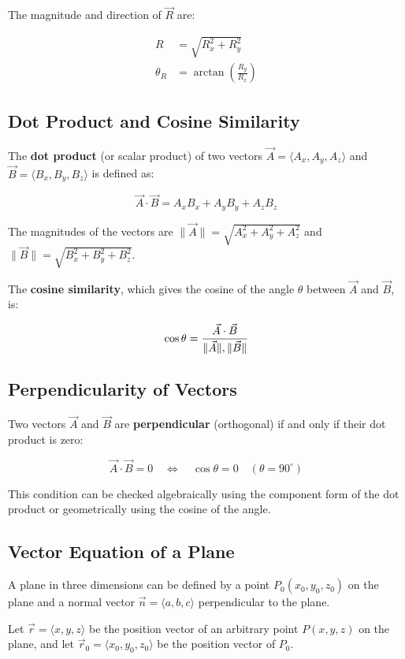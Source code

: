 \documentclass{article}
\begin{document}
\begin{multicols}{2}
The magnitude and direction of $ \vec{R} $ are:

\[
\begin{aligned}
R &= \sqrt{R_x^2 + R_y^2} \\
\theta_R &= \arctan\left( \frac{R_y}{R_x} \right)
\end{aligned}
\]

\subsection*{Dot Product and Cosine Similarity}

The \textbf{dot product} (or scalar product) of two vectors $\vec{A} = \langle A_x, A_y, A_z \rangle$ and $\vec{B} = \langle B_x, B_y, B_z \rangle$ is defined as:

\[
\vec{A} \cdot \vec{B} = A_x B_x + A_y B_y + A_z B_z
\]

The magnitudes of the vectors are $\|\vec{A}\| = \sqrt{A_x^2 + A_y^2 + A_z^2}$ and $\|\vec{B}\| = \sqrt{B_x^2 + B_y^2 + B_z^2}$.  

The \textbf{cosine similarity}, which gives the cosine of the angle $\theta$ between $\vec{A}$ and $\vec{B}$, is:

\[
\cos \theta = \frac{\vec{A} \cdot \vec{B}}{\|\vec{A}\| \\, \|\vec{B}\|}
\]

\subsection*{Perpendicularity of Vectors}

Two vectors $\vec{A}$ and $\vec{B}$ are \textbf{perpendicular} (orthogonal) if and only if their dot product is zero:

\[
\vec{A} \cdot \vec{B} = 0 \quad \Longleftrightarrow \quad \cos \theta = 0 \quad (\theta = 90^\circ)
\]

This condition can be checked algebraically using the component form of the dot product or geometrically using the cosine of the angle.

\subsection*{Vector Equation of a Plane}

A plane in three dimensions can be defined by a point $P_0(x_0,y_0,z_0)$ on the plane and a normal vector $\vec{n} = \langle a,b,c \rangle$ perpendicular to the plane.  

Let $\vec{r} = \langle x,y,z \rangle$ be the position vector of an arbitrary point $P(x,y,z)$ on the plane, and let $\vec{r}_0 = \langle x_0,y_0,z_0 \rangle$ be the position vector of $P_0$.  


\end{multicols}
\end{document}
